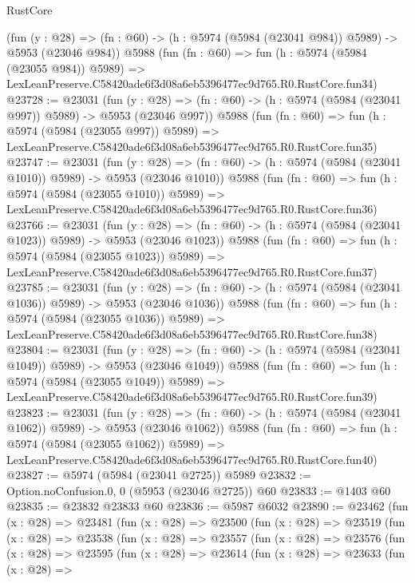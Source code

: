 \begin{lexlean}{RustCore}
\begin{coremodule}
    (fun (y : @28) => (fn : @60) -> (h : @5974 (@5984 (@23041 @984)) @5989) -> @5953 (@23046 @984))
    @5988
    (fun (fn : @60) =>
    fun (h : @5974 (@5984 (@23055 @984)) @5989) =>
    LexLeanPreserve.C58420ade6f3d08a6eb5396477ec9d765.R0.RustCore.fun34)
@23728 := @23031
    (fun (y : @28) => (fn : @60) -> (h : @5974 (@5984 (@23041 @997)) @5989) -> @5953 (@23046 @997))
    @5988
    (fun (fn : @60) =>
    fun (h : @5974 (@5984 (@23055 @997)) @5989) =>
    LexLeanPreserve.C58420ade6f3d08a6eb5396477ec9d765.R0.RustCore.fun35)
@23747 := @23031
    (fun (y : @28) =>
    (fn : @60) -> (h : @5974 (@5984 (@23041 @1010)) @5989) -> @5953 (@23046 @1010))
    @5988
    (fun (fn : @60) =>
    fun (h : @5974 (@5984 (@23055 @1010)) @5989) =>
    LexLeanPreserve.C58420ade6f3d08a6eb5396477ec9d765.R0.RustCore.fun36)
@23766 := @23031
    (fun (y : @28) =>
    (fn : @60) -> (h : @5974 (@5984 (@23041 @1023)) @5989) -> @5953 (@23046 @1023))
    @5988
    (fun (fn : @60) =>
    fun (h : @5974 (@5984 (@23055 @1023)) @5989) =>
    LexLeanPreserve.C58420ade6f3d08a6eb5396477ec9d765.R0.RustCore.fun37)
@23785 := @23031
    (fun (y : @28) =>
    (fn : @60) -> (h : @5974 (@5984 (@23041 @1036)) @5989) -> @5953 (@23046 @1036))
    @5988
    (fun (fn : @60) =>
    fun (h : @5974 (@5984 (@23055 @1036)) @5989) =>
    LexLeanPreserve.C58420ade6f3d08a6eb5396477ec9d765.R0.RustCore.fun38)
@23804 := @23031
    (fun (y : @28) =>
    (fn : @60) -> (h : @5974 (@5984 (@23041 @1049)) @5989) -> @5953 (@23046 @1049))
    @5988
    (fun (fn : @60) =>
    fun (h : @5974 (@5984 (@23055 @1049)) @5989) =>
    LexLeanPreserve.C58420ade6f3d08a6eb5396477ec9d765.R0.RustCore.fun39)
@23823 := @23031
    (fun (y : @28) =>
    (fn : @60) -> (h : @5974 (@5984 (@23041 @1062)) @5989) -> @5953 (@23046 @1062))
    @5988
    (fun (fn : @60) =>
    fun (h : @5974 (@5984 (@23055 @1062)) @5989) =>
    LexLeanPreserve.C58420ade6f3d08a6eb5396477ec9d765.R0.RustCore.fun40)
@23827 := @5974 (@5984 (@23041 @2725)) @5989
@23832 := Option.noConfusion.{0, 0} (@5953 (@23046 @2725)) @60
@23833 := @1403 @60
@23835 := @23832 @23833 @60
@23836 := @5987 @6032
@23890 := @23462
    (fun (x : @28) =>
    @23481
      (fun (x : @28) =>
      @23500
        (fun (x : @28) =>
        @23519
          (fun (x : @28) =>
          @23538
            (fun (x : @28) =>
            @23557
              (fun (x : @28) =>
              @23576
                (fun (x : @28) =>
                @23595
                  (fun (x : @28) =>
                  @23614
                    (fun (x : @28) =>
                    @23633
                      (fun (x : @28) =>

\end{coremodule}
\end{lexlean}
